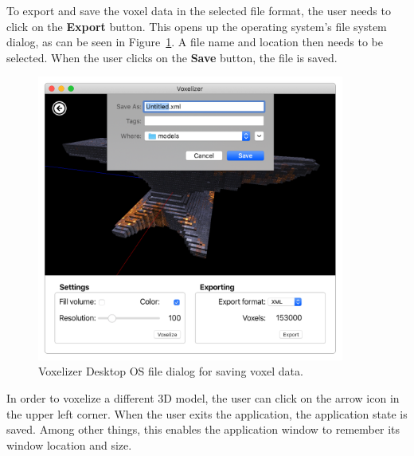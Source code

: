 To export and save the voxel data in the selected file format, the user needs to click on the \textbf{Export} button. This opens up the operating system's file system dialog, as can be seen in Figure~\ref{fig:voxelizer-desktop-gui-export}. A file name and location then needs to be selected. When the user clicks on the \textbf{Save} button, the file is saved.
\begin{figure}[htp]
    \centering
    \includegraphics[width=0.9\textwidth]{sections/result/figures/voxelizer-desktop-gui-export.png}
    \caption{Voxelizer Desktop OS file dialog for saving voxel data.}
    \label{fig:voxelizer-desktop-gui-export}
\end{figure}

In order to voxelize a different 3D model, the user can click on the arrow icon in the upper left corner. When the user exits the application, the application state is saved. Among other things, this enables the application window to remember its window location and size.

